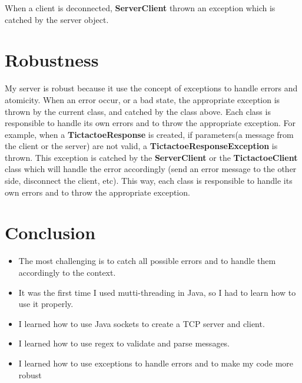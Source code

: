 \documentclass[11pt]{article}
\begin{document}
When a client is deconnected, \textbf{ServerClient} thrown an exception which is catched by the server object.

\section{Robustness}
My server is robust because it use the concept of exceptions to handle errors and atomicity.
When an error occur, or a bad state, the appropriate exception is thrown by the current class, 
and catched by the class above. Each class is responsible to handle its own errors and to throw the appropriate exception.
For example, when a \textbf{TictactoeResponse} is created, if parameters(a message from the client or the server) are not valid, a \textbf{TictactoeResponseException} is thrown.
This exception is catched by the \textbf{ServerClient} or the \textbf{TictactoeClient} class which will handle the error accordingly (send an error message to the other side, disconnect the client, etc).
This way, each class is responsible to handle its own errors and to throw the appropriate exception.

\section{Conclusion}
\begin{itemize}
    \item The most challenging is to catch all possible errors and to handle them accordingly to the context.
    \item It was the first time I used mutti-threading in Java, so I had to learn how to use it properly.
    \item I learned how to use Java sockets to create a TCP server and client.
    \item I learned how to use regex to validate and parse messages.
    \item I learned how to use exceptions to handle errors and to make my code more robust
\end{itemize}
\end{document}
